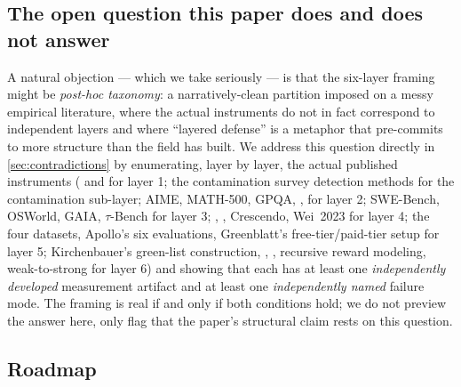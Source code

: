 \subsection*{The open question this paper does and does not answer}

A natural objection --- which we take seriously --- is that the
six-layer framing might be \emph{post-hoc taxonomy}: a
narratively-clean partition imposed on a messy empirical
literature, where the actual instruments do not in fact correspond
to independent layers and where ``layered defense'' is a metaphor
that pre-commits to more structure than the field has built. We
address this question directly in \cref{sec:contradictions} by
enumerating, layer by layer, the actual published instruments
( and  for layer 1; the contamination survey
detection methods for the contamination sub-layer; AIME, MATH-500,
GPQA, ,  for layer 2; SWE-Bench, OSWorld, GAIA,
$\tau$-Bench for layer 3; , , Crescendo,
Wei~2023 for layer 4; the four  datasets, Apollo's six
 evaluations, Greenblatt's free-tier/paid-tier setup for
layer 5; Kirchenbauer's green-list construction, , ,
recursive reward modeling, weak-to-strong for layer 6) and showing
that each has at least one \emph{independently developed} measurement
artifact and at least one \emph{independently named} failure mode.
The framing is real if and only if both conditions hold; we do not
preview the answer here, only flag that the paper's structural
claim rests on this question.

\subsection*{Roadmap}

